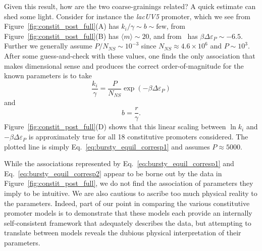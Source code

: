 Given this result, how are the two coarse-grainings related? A quick estimate
can shed some light. Consider for instance the \textit{lacUV5} promoter, which
we see from Figure~\ref{fig:constit_post_full}(A) has $k_i/\gamma \sim b \sim
\text{few}$, from Figure~\ref{fig:constit_post_full}(B) has $\langle m \rangle
\sim 20$, and from~\cite{Brewster2012} has $\beta\Delta\varepsilon_P \sim -
6.5$. Further we generally assume $P/N_{NS} \sim 10^{-3}$ since
$N_{NS}\approx4.6\times10^6$ and $P\sim10^3$. After some guess-and-check with
these values, one finds the only association that makes dimensional sense and
produces the correct order-of-magnitude for the known parameters is to take
\begin{equation}
\frac{k_i}{\gamma} = \frac{P}{N_{NS}} \exp(-\beta\Delta\varepsilon_P)
\label{eq:bursty_equil_corresp1}
\end{equation}
and
\begin{equation}
b = \frac{r}{\gamma}.
\label{eq:bursty_equil_corresp2}
\end{equation}
Figure~\ref{fig:constit_post_full}(D) shows that this linear scaling between
$\ln k_i$ and $-\beta\Delta\varepsilon_P$ is approximately true for all 18
constitutive promoters considered. The plotted line is simply
Eq.~\ref{eq:bursty_equil_corresp1} and assumes $P\approx 5000$.

While the associations represented by Eq.~\ref{eq:bursty_equil_corresp1} and
Eq.~\ref{eq:bursty_equil_corresp2} appear to be borne out by the data in
Figure~\ref{fig:constit_post_full}, we do not find the association of parameters
they imply to be intuitive. We are also cautious to ascribe too much physical
reality to the parameters. Indeed, part of our point in comparing the various
constitutive promoter models is to demonstrate that these models each provide an
internally self-consistent framework that adequately describes the data, but
attempting to translate between models reveals the dubious physical
interpretation of their parameters.

